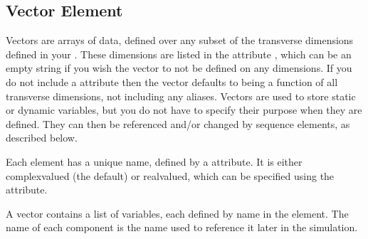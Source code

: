 \documentclass[letterpaper,10pt,english]{sphinxmanual}
\begin{document}
\subsection{Vector Element}
\label{\detokenize{reference_elements:vector-element}}\label{\detokenize{reference_elements:vectorelement}}\label{\detokenize{reference_elements:index-44}}
\sphinxAtStartPar
Vectors are arrays of data, defined over any subset of the transverse dimensions defined in your {\hyperref[\detokenize{reference_elements:geometryelement}]{}}.  These dimensions are listed in the attribute , which can be an empty string if you wish the vector to not be defined on any dimensions.  If you do not include a  attribute then the vector defaults to being a function of all transverse dimensions, not including any aliases.  Vectors are used to store static or dynamic variables, but you do not have to specify their purpose when they are defined.  They can then be referenced and/or changed by sequence elements, as described below.

\ignorespaces 
\sphinxAtStartPar
Each  element has a unique name, defined by a  attribute.  It is either complex\sphinxhyphen{}valued (the default) or real\sphinxhyphen{}valued, which can be specified using the  attribute.

\ignorespaces {}\label{\detokenize{reference_elements:componentselement}}
\sphinxAtStartPar
A vector contains a list of variables, each defined by name in the  element.  The name of each component is the name used to reference it later in the simulation.
\end{document}
